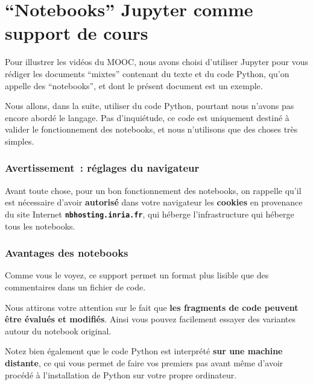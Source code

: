     
    
    
    

    

    \hypertarget{notebooks-jupyter-comme-support-de-cours}{%
\section{``Notebooks'' Jupyter comme support de
cours}\label{notebooks-jupyter-comme-support-de-cours}}

    Pour illustrer les vidéos du MOOC, nous avons choisi d'utiliser Jupyter
pour vous rédiger les documents ``mixtes'' contenant du texte et du code
Python, qu'on appelle des ``notebooks'', et dont le présent document est
un exemple.

Nous allons, dans la suite, utiliser du code Python, pourtant nous
n'avons pas encore abordé le langage. Pas d'inquiétude, ce code est
uniquement destiné à valider le fonctionnement des notebooks, et nous
n'utilisons que des choses très simples.

    \hypertarget{avertissement-ruxe9glages-du-navigateur}{%
\subsubsection{Avertissement~: réglages du
navigateur}\label{avertissement-ruxe9glages-du-navigateur}}

    Avant toute chose, pour un bon fonctionnement des notebooks, on rappelle
qu'il est nécessaire d'avoir \textbf{autorisé} dans votre navigateur les
\textbf{cookies} en provenance du site Internet
\textbf{\texttt{nbhosting.inria.fr}}, qui héberge l'infrastructure qui
héberge tous les notebooks.

    \hypertarget{avantages-des-notebooks}{%
\subsubsection{Avantages des notebooks}\label{avantages-des-notebooks}}

    Comme vous le voyez, ce support permet un format plus lisible que des
commentaires dans un fichier de code.

    Nous attirons votre attention sur le fait que \textbf{les fragments de
code peuvent être évalués et modifiés}. Ainsi vous pouvez facilement
essayer des variantes autour du notebook original.

Notez bien également que le code Python est interprété \textbf{sur une
machine distante}, ce qui vous permet de faire vos premiers pas avant
même d'avoir procédé à l'installation de Python sur votre propre
ordinateur.

